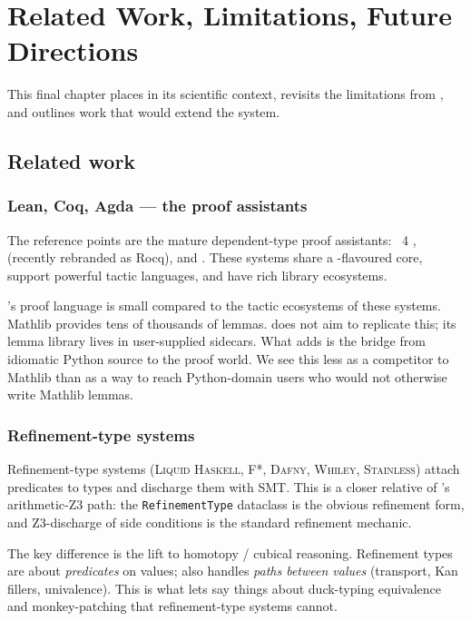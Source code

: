 \chapter{Related Work, Limitations, Future Directions}
\label{ch:related}

This final chapter places \Deppy{} in its scientific context,
revisits the limitations from , and outlines
work that would extend the system.

\section{Related work}

\subsection{Lean, Coq, Agda --- the proof assistants}

The reference points are the mature dependent-type proof
assistants: \Lean{}~4 \citep{LeanFour}, \Coq{} (recently rebranded
as Rocq), and \Agda{}.  These systems share a \CIC-flavoured
core, support powerful tactic languages, and have rich library
ecosystems.

\Deppy{}'s proof language is small compared to the tactic
ecosystems of these systems.  Mathlib \citep{LeanCommunityMathlib}
provides tens of thousands of lemmas.  \Deppy{} does not aim to
replicate this; its lemma library lives in user-supplied sidecars.
What \Deppy{} adds is the bridge from idiomatic Python source to
the proof world.  We see this less as a competitor to Mathlib than
as a way to reach Python-domain users who would not otherwise write
Mathlib lemmas.

\subsection{Refinement-type systems}

Refinement-type systems (\textsc{Liquid Haskell}, \textsc{F*},
\textsc{Dafny}, \textsc{Whiley}, \textsc{Stainless}) attach
predicates to types and discharge them with SMT.  This is a closer
relative of \Deppy{}'s arithmetic-Z3 path: the
\texttt{RefinementType} dataclass is the obvious refinement form,
and Z3-discharge of side conditions is the standard refinement
mechanic.

The key difference is the lift to homotopy / cubical reasoning.
Refinement types are about \emph{predicates} on values;
\Deppy{} also handles \emph{paths between values} (transport, Kan
fillers, univalence).  This is what lets \Deppy{} say things about
duck-typing equivalence and monkey-patching that refinement-type
systems cannot.

